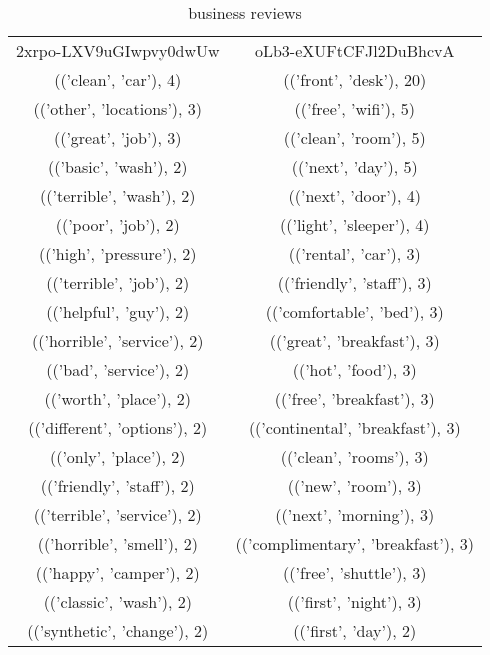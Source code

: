 	\begin{center}
		\tiny
		\begin{table}[!h]
		\caption{business reviews}
		\begin{tabular}{c c}
			2xrpo-LXV9uGIwpvy0dwUw		&oLb3-eXUFtCFJl2DuBhcvA\\
			(('clean', 'car'), 4)		&(('front', 'desk'), 20)\\
			(('other', 'locations'), 3)		&(('free', 'wifi'), 5)\\
			(('great', 'job'), 3)		&(('clean', 'room'), 5)\\
			(('basic', 'wash'), 2)		&(('next', 'day'), 5)\\
			(('terrible', 'wash'), 2)		&(('next', 'door'), 4)\\
			(('poor', 'job'), 2)		&(('light', 'sleeper'), 4)\\
			(('high', 'pressure'), 2)		&(('rental', 'car'), 3)\\
			(('terrible', 'job'), 2)		&(('friendly', 'staff'), 3)\\
			(('helpful', 'guy'), 2)		&(('comfortable', 'bed'), 3)\\
			(('horrible', 'service'), 2)		&(('great', 'breakfast'), 3)\\
			(('bad', 'service'), 2)		&(('hot', 'food'), 3)\\
			(('worth', 'place'), 2)		&(('free', 'breakfast'), 3)\\
			(('different', 'options'), 2)		&(('continental', 'breakfast'), 3)\\
			(('only', 'place'), 2)		&(('clean', 'rooms'), 3)\\
			(('friendly', 'staff'), 2)		&(('new', 'room'), 3)\\
			(('terrible', 'service'), 2)		&(('next', 'morning'), 3)\\
			(('horrible', 'smell'), 2)		&(('complimentary', 'breakfast'), 3)\\
			(('happy', 'camper'), 2)		&(('free', 'shuttle'), 3)\\
			(('classic', 'wash'), 2)		&(('first', 'night'), 3)\\
			(('synthetic', 'change'), 2)		&(('first', 'day'), 2)\\
		\end{tabular}
	\end{table}
	\end{center}
